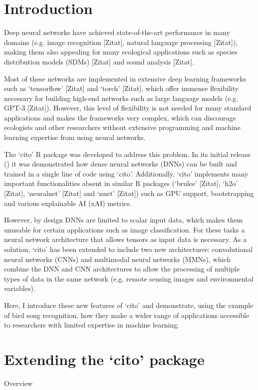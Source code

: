 \documentclass[12pt,twoside]{scrreport}
\newcommand{\pkg}[1]{`#1'}
\begin{document}
\chapter*{Introduction}
\setcounter{page}{1}
Deep neural networks have achieved state-of-the-art performance in many domains (e.g. image recognition [Zitat], natural language processing [Zitat]), making them also appealing for many ecological applications such as species distribution models (SDMs) [Zitat] and sound analysis [Zitat].

Most of these networks are implemented in extensive deep learning frameworks such as \pkg{tensorflow} [Zitat] and \pkg{torch} [Zitat], which offer immense flexibility necessary for building high-end networks such as large language models (e.g. GPT-3 [Zitat]). However, this level of flexibility is not needed for many standard applications and makes the frameworks very complex, which can discourage ecologists and other researchers without extensive programming and machine learning expertise from using neural networks.

The \pkg{cito} R package was developed to address this problem. In its initial release (\cite{amesoderCitoPackageTraining2024}) it was demonstrated how dense neural networks (DNNs) can be built and trained in a single line of code using \pkg{cito}. Additionally, \pkg{cito} implements many important functionalities absent in similar R packages (\pkg{brulee} [Zitat], \pkg{h2o} [Zitat], \pkg{neuralnet} [Zitat] and \pkg{nnet} [Zitat]) such as GPU support, bootstrapping and various explainable AI (xAI) metrics.

However, by design DNNs are limited to scalar input data, which makes them unusable for certain applications such as image classification. For these tasks a neural network architecture that allows tensors as input data is necessary.
As a solution, \pkg{cito} has been extended to include two new architectures: convolutional neural networks (CNNs) and multimodal neural networks (MMNs), which combine the DNN and CNN architectures to allow the processing of multiple types of data in the same network (e.g. remote sensing images and environmental variables).

Here, I introduce these new features of \pkg{cito} and demonstrate, using the example of bird song recognition, how they make a wider range of applications accessible to researchers with limited expertise in machine learning.


\chapter*{Extending the \pkg{cito} package}
\addcontentsline{toc}{chapter}{Extending the \pkg{cito} package}
Overview
\end{document}
